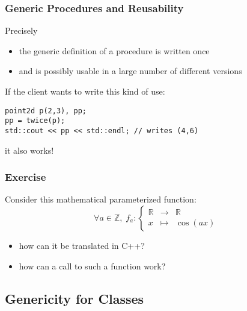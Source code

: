\documentclass{beamer}
\newcommand{\cpp}{{C++}\xspace}
\begin{document}
\begin{frame}[fragile]
  \frametitle{Generic Procedures and Reusability}

Precisely
\begin{itemize}
\item the generic definition of a procedure is written once
\item and is possibly usable in a large number of different versions
\end{itemize}

If the client wants to write this kind of use:
\begin{lstlisting}
point2d p(2,3), pp;
pp = twice(p);
std::cout << pp << std::endl; // writes (4,6)
\end{lstlisting} %
it also works!

\end{frame}




\begin{frame}
  \frametitle{Exercise}

Consider this mathematical parameterized function:
$$
\forall a \in \mathbb{Z}, \;
f_a: \left\{
  \begin{array}{lll}
    \mathbb{R} &\rightarrow & \mathbb{R} \\
    x & \mapsto & \cos(a x)
  \end{array}
\right.
$$

\begin{itemize}
\item how can it be translated in \cpp?
\item how can a call to such a function work?
\end{itemize}

\end{frame}



\subsection{Genericity for Classes}
\end{document}

